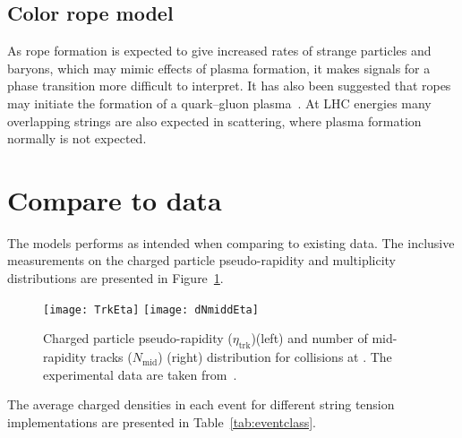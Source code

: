 \documentclass[ALICE,manyauthors]{StrinJet}
\begin{document}
\subsection{Color rope model}
\label{subsec:rope}

As rope formation is expected to give increased rates of strange particles and baryons, which may mimic effects of plasma formation, it makes signals for a phase transition more difficult to interpret.
It has also been suggested that ropes may initiate the formation of a quark–gluon plasma~\cite{Gyulassy:1985oqt, Kajantie:1985jh, Gatoff:1987uf, Braun:1997ch}.
At LHC energies many overlapping strings are also expected in \pp scattering, where plasma formation normally is not expected.

\section{Compare to data}
\label{sec:com2da}
The models performs as intended when comparing to existing data.
The inclusive measurements on the charged particle pseudo-rapidity and multiplicity distributions are presented in Figure~\ref{fig:trkinfo}.
\begin{figure}[htp]
	\begin{center}
		\texttt{[image: TrkEta]}
		\texttt{[image: dNmiddEta]}
	\end{center}
	\caption{Charged particle pseudo-rapidity ($\eta_\mathrm{trk}$)(left) and number of mid-rapidity tracks ($N_\mathrm{mid}$) (right) distribution for \pp collisions at \seven.  The experimental data are taken from~\cite{ALICE:2010mty}.}
	\label{fig:trkinfo}
\end{figure}

The average charged densities in each event for different string tension implementations are presented in Table~\ref{tab:eventclass}.
\end{document}
